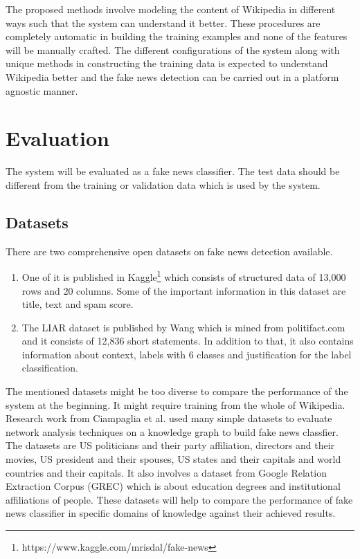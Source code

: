 \documentclass[a4paper, 11pt]{article}
\begin{document}

The proposed methods involve modeling the content of Wikipedia in different ways such that the system can understand it better. These procedures are completely automatic in building the training examples and none of the features will be manually crafted. The different configurations of the system along with unique methods in constructing the training data is expected to understand Wikipedia better and the fake news detection can be carried out in a platform agnostic manner. 

\section{Evaluation}

The system will be evaluated as a fake news classifier. The test data should be different from the training or validation data which is used by the system. 

\subsection{Datasets}

There are two comprehensive open datasets on fake news detection available.
\begin{enumerate}
\item  One of it is published in Kaggle\footnote{https://www.kaggle.com/mrisdal/fake-news} which consists of structured data of 13,000 rows and 20 columns. Some of the important information in this dataset are title, text and spam score. 
\item The LIAR dataset is published by Wang \parencite{Wang2017} which is mined from politifact.com and it consists of 12,836 short statements. In addition to that, it also contains information about context, labels with 6 classes and justification for the label classification. 
\end{enumerate}

The mentioned datasets might be too diverse to compare the performance of the system at the beginning. It might require training from the whole of Wikipedia. Research work from Ciampaglia et al. \parencite{Ciampaglia2015} used many simple datasets to evaluate network analysis techniques on a knowledge graph to build fake news classfier. The datasets are US politicians and their party affiliation, directors and their movies, US president and their spouses, US states and their capitals and world countries and their capitals. It also involves a dataset from Google Relation Extraction Corpus (GREC) which is about education degrees and institutional affiliations of people. These datasets will help to compare the performance of fake news classifier in specific domains of knowledge against their achieved results.
\end{document}
